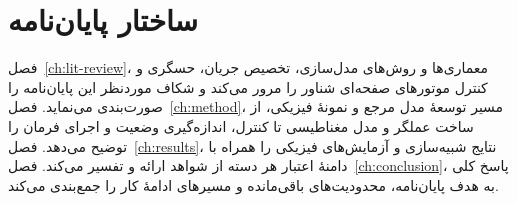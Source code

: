 \section{ساختار پایان‌نامه}
\label{sec:structure}

فصل~\ref{ch:lit-review}، معماری‌ها و روش‌های مدل‌سازی، تخصیص جریان، حسگری و کنترل موتورهای صفحه‌ای شناور را مرور می‌کند و شکاف موردنظر این پایان‌نامه را صورت‌بندی می‌نماید. فصل~\ref{ch:method}، مسیر توسعهٔ مدل مرجع و نمونهٔ فیزیکی، از ساخت عملگر و مدل مغناطیسی تا کنترل، اندازه‌گیری وضعیت و اجرای فرمان را توضیح می‌دهد. فصل~\ref{ch:results}، نتایج شبیه‌سازی و آزمایش‌های فیزیکی را همراه با دامنهٔ اعتبار هر دسته از شواهد ارائه و تفسیر می‌کند. فصل~\ref{ch:conclusion}، پاسخ کلی به هدف پایان‌نامه، محدودیت‌های باقی‌مانده و مسیرهای ادامهٔ کار را جمع‌بندی می‌کند.

